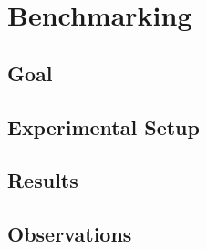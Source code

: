 \chapter{Benchmarking}
\section{Goal}
\section{Experimental Setup}
\section{Results}
\section{Observations}